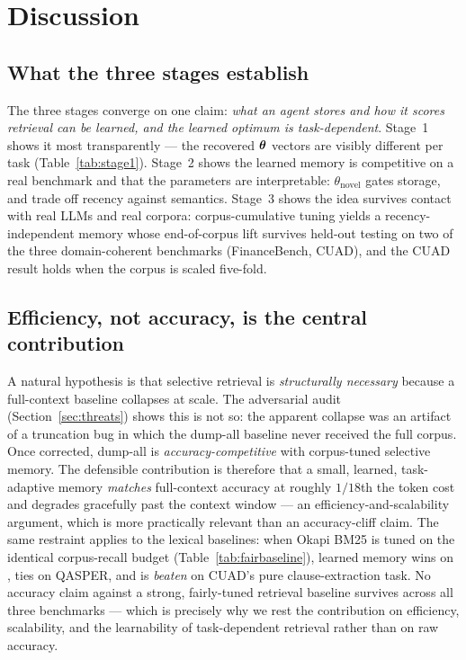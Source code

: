\chapter{Discussion}
\label{ch:discussion}

\section{What the three stages establish}
The three stages converge on one claim: \emph{what an agent stores and how it
scores retrieval can be learned, and the learned optimum is task-dependent}.
Stage~1 shows it most transparently --- the recovered $\boldsymbol{\theta}$ vectors are
visibly different per task (Table~\ref{tab:stage1}). Stage~2 shows the learned
memory is competitive on a real benchmark and that the parameters are
interpretable: $\theta_{\mathrm{novel}}$ gates storage, \wrec{} and \wembed{}
trade off recency against semantics. Stage~3 shows the idea survives contact with
real LLMs and real corpora: corpus-cumulative tuning yields a recency-independent
memory whose end-of-corpus lift survives held-out testing on two of the three
domain-coherent benchmarks (FinanceBench, CUAD), and the CUAD result holds when
the corpus is scaled five-fold.

\section{Efficiency, not accuracy, is the central contribution}
A natural hypothesis is that selective retrieval is \emph{structurally necessary}
because a full-context baseline collapses at scale. The adversarial audit
(Section~\ref{sec:threats}) shows this is not so: the apparent collapse was an
artifact of a truncation bug in which the dump-all baseline never received the
full corpus. Once corrected,
dump-all is \emph{accuracy-competitive} with corpus-tuned selective memory. The
defensible contribution is therefore that a small, learned, task-adaptive memory
\emph{matches} full-context accuracy at roughly $1/18$th the token cost and
degrades gracefully past the context window --- an efficiency-and-scalability
argument, which is more practically relevant than an
accuracy-cliff claim. The same restraint applies to the lexical baselines: when
Okapi BM25 is tuned on the identical corpus-recall budget
(Table~\ref{tab:fairbaseline}), learned memory wins on \FB{}, ties on QASPER, and
is \emph{beaten} on CUAD's pure clause-extraction task. No accuracy claim against
a strong, fairly-tuned retrieval baseline survives across all three benchmarks ---
which is precisely why we rest the contribution on efficiency, scalability, and
the learnability of task-dependent retrieval rather than on raw accuracy.

